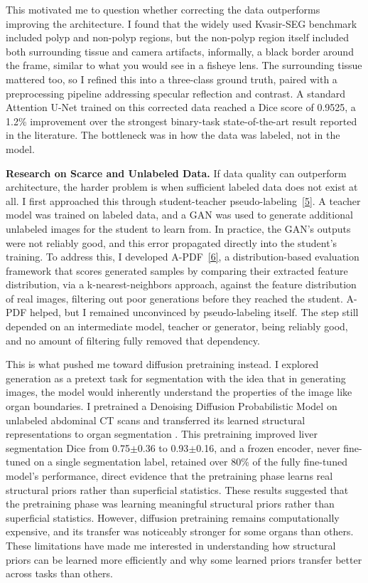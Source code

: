 \documentclass[11pt]{article}
\begin{document}
This motivated me to question whether correcting the data outperforms improving the architecture. I found that the widely used Kvasir-SEG benchmark included polyp and non-polyp regions, but the non-polyp region itself included both surrounding tissue and camera artifacts, informally, a black border around the frame, similar to what you would see in a fisheye lens. The surrounding tissue mattered too, so I refined this into a three-class ground truth, paired with a preprocessing pipeline addressing specular reflection and contrast. A standard Attention U-Net trained on this corrected data reached a Dice score of 0.9525, a 1.2\% improvement over the strongest binary-task state-of-the-art result reported in the literature. The bottleneck was in how the data was labeled, not in the model.

\vspace{8pt}

\textbf{Research on Scarce and Unlabeled Data.} If data quality can outperform architecture, the harder problem is when sufficient labeled data does not exist at all. I first approached this through student-teacher pseudo-labeling~\hyperref[ref5]{[5]}. A teacher model was trained on labeled data, and a GAN was used to generate additional unlabeled images for the student to learn from. In practice, the GAN's outputs were not reliably good, and this error propagated directly into the student's training. To address this, I developed A-PDF~\hyperref[ref6]{[6]}, a distribution-based evaluation framework that scores generated samples by comparing their extracted feature distribution, via a k-nearest-neighbors approach, against the feature distribution of real images, filtering out poor generations before they reached the student. A-PDF helped, but I remained unconvinced by pseudo-labeling itself. The step still depended on an intermediate model, teacher or generator, being reliably good, and no amount of filtering fully removed that dependency.

This is what pushed me toward diffusion pretraining instead. I explored generation as a pretext task for segmentation with the idea that in generating images, the model would inherently understand the properties of the image like organ boundaries. I pretrained a Denoising Diffusion Probabilistic Model on unlabeled abdominal CT scans and transferred its learned structural representations to organ segmentation . This pretraining improved liver segmentation Dice from 0.75$\pm$0.36 to 0.93$\pm$0.16, and a frozen encoder, never fine-tuned on a single segmentation label, retained over 80\% of the fully fine-tuned model's performance, direct evidence that the pretraining phase learns real structural priors rather than superficial statistics. These results suggested that the pretraining phase was learning meaningful structural priors rather than superficial statistics. However, diffusion pretraining remains computationally expensive, and its transfer was noticeably stronger for some organs than others. These limitations have made me interested in understanding how structural priors can be learned more efficiently and why some learned priors transfer better across tasks than others.
\end{document}
